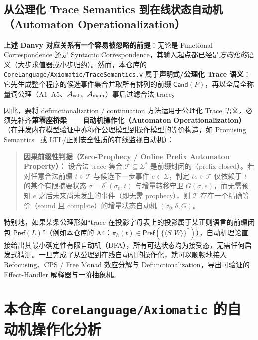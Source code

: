 \documentclass[UTF8,a4paper,11pt,fontset=fandol]{ctexart}
\newcommand{\code}[1]{\texttt{#1}}
\newcommand{\seq}[1]{\langle #1\rangle}
\newcommand{\Cand}{\mathsf{Cand}}
\begin{document}
\subsection{从公理化 Trace Semantics 到在线状态自动机（Automaton Operationalization）}

\textbf{上述 Danvy 对应关系有一个容易被忽略的前提}：无论是 Functional Correspondence 还是 Syntactic Correspondence，其输入起点都已经是\emph{方向化的}语义（大步求值器或小步归约）。然而，本仓库的 \code{CoreLanguage/Axiomatic/TraceSemantics.v} 属于\textbf{声明式/公理化 Trace 语义}：它先生成整个程序的候选事件集合并取所有排列的前缀 $\Cand(P)$，再以全局全称量词公理（$\mathrm{A1}$--$\mathrm{A5}$、$\mathcal A_{\rm val}$、$\mathcal A_{\rm mem}$）事后过滤合法 trace。

因此，要将 defunctionalization / continuation 方法运用于公理化 Trace 语义，必须先补齐\textbf{第零座桥梁——自动机操作化（Automaton Operationalization）}（在并发内存模型验证中亦称作公理模型到操作模型的等价构造，如 Promising Semantics~\cite{kang2017promising} 或 LTL/正则安全性质的在线监视自动机）：

\begin{quote}
\textbf{因果前缀性判据（Zero-Prophecy / Online Prefix Automaton Property）：}
设合法 trace 集合 $\mathcal T \subseteq \Sigma^*$ 是前缀封闭的（prefix-closed）。若对任意合法前缀 $t \in \mathcal T$ 与候选下一步事件 $e \in \Sigma$，判定 $te \in \mathcal T$ 仅依赖于 $t$ 的某个有限摘要状态 $\sigma = \delta^*( \sigma_0, t )$ 与增量转移守卫 $G(\sigma, e)$，而无需预知 $e$ 之后未来尚未发生的事件（即无需 prophecy），则 $\mathcal T$ 存在一个精确等价（sound 且 complete）的增量状态自动机 $(\sigma_0, \delta, G)$。
\end{quote}

特别地，如果某条公理形如“trace 在投影字母表上的投影属于某正则语言的前缀闭包 $\mathsf{Pref}(L)$”（例如本仓库的 $\mathrm{A4}$：$\pi_h(t) \in \mathsf{Pref}(\{\seq{S, W}\}^*)$），自动机理论直接给出其最小确定性有限自动机（DFA），所有可达状态均为接受态，无需任何启发式猜测。一旦完成了从公理到在线自动机的操作化，就可以顺畅地接入 Refocusing、CPS / Free Monad 效应分解与 Defunctionalization，导出可验证的 Effect-Handler 解释器与一阶抽象机。

\section{本仓库 \texorpdfstring{\code{CoreLanguage/Axiomatic}}{CoreLanguage/Axiomatic} 的自动机操作化分析}
\label{sec:automaton}
\end{document}
